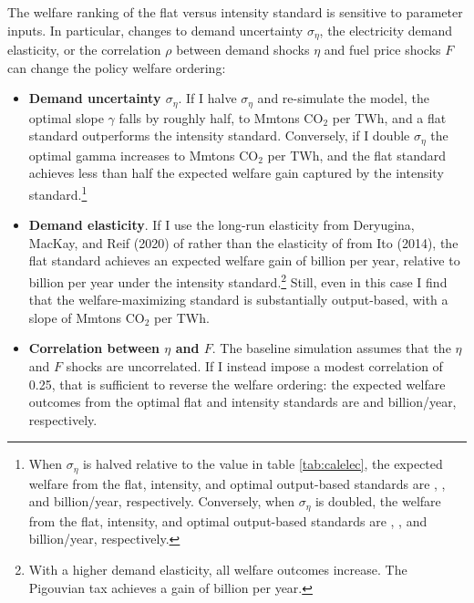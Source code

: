 \documentclass[12pt]{article}
\begin{document}
The welfare ranking of the flat versus intensity standard is sensitive to parameter inputs. In particular, changes to demand uncertainty $\sigma_\eta$, the electricity demand elasticity, or the correlation $\rho$ between demand shocks $\eta$ and fuel price shocks $F$ can change the policy welfare ordering:
\begin{itemize}
\item \textbf{Demand uncertainty $\sigma_\eta$}. If I halve $\sigma_\eta$ and re-simulate the model, the optimal slope $\gamma$ falls by roughly half, to Mmtons CO$_2$ per TWh, and a flat standard outperforms the intensity standard. Conversely, if I double $\sigma_\eta$ the optimal gamma increases to Mmtons CO$_2$ per TWh, and the flat standard achieves less than half the expected welfare gain captured by the intensity standard.\footnote{When $\sigma_\eta$ is halved relative to the value in table \ref{tab:calelec}, the expected welfare from the flat, intensity, and optimal output-based standards are \unskip, \unskip, and billion/year, respectively. Conversely, when $\sigma_\eta$ is doubled, the welfare from the flat, intensity, and optimal output-based standards are \unskip, \unskip, and billion/year, respectively.} 
\item \textbf{Demand elasticity}. If I use the long-run elasticity from  Deryugina, MacKay, and Reif (2020) of rather than the elasticity of from Ito (2014), the flat standard achieves an expected welfare gain of billion per year, relative to billion per year under the intensity standard.\footnote{With a higher demand elasticity, all welfare outcomes increase. The Pigouvian tax achieves a gain of billion per year.} Still, even in this case I find that the welfare-maximizing standard is substantially output-based, with a slope of Mmtons CO$_2$ per TWh.
\item \textbf{Correlation between $\eta$ and $F$}. The baseline simulation assumes that the $\eta$ and $F$ shocks are uncorrelated. If I instead impose a modest correlation of 0.25, that is sufficient to reverse the welfare ordering: the expected welfare outcomes from the optimal flat and intensity standards are and billion/year, respectively.
\end{itemize}
\end{document}
